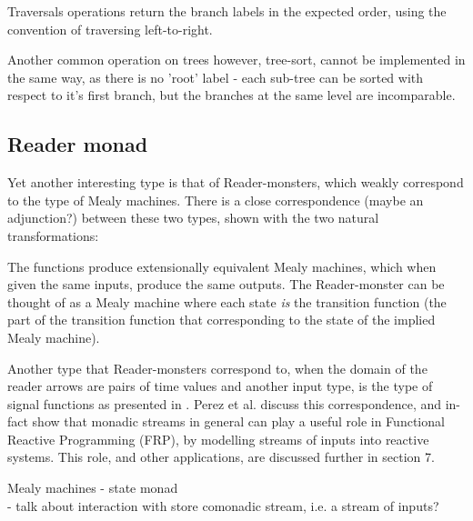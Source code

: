\documentclass{article}
\begin{document}
Traversals operations return the branch labels in the expected order, using the convention of traversing left-to-right.

Another common operation on trees however, tree-sort, cannot be implemented in the same way, as there is no 'root' label - each sub-tree can be sorted with respect to it's first branch, but the branches at the same level are incomparable.

\subsection{Reader monad}

Yet another interesting type is that of Reader-monsters, which weakly correspond to the type of Mealy machines. There is a close correspondence (maybe an adjunction?) between these two types, shown with the two natural transformations:
The functions produce extensionally equivalent Mealy machines, which when given the same inputs, produce the same outputs. The Reader-monster can be thought of as a Mealy machine where each state \emph{is} the transition function (the part of the transition function that corresponding to the state of the implied Mealy machine).

Another type that Reader-monsters correspond to, when the domain of the reader arrows are pairs of time values and another input type, is the type of signal functions as presented in \cite{frp_refactored}. Perez et al. discuss this correspondence, and in-fact show that monadic streams in general can play a useful role in Functional Reactive Programming (FRP), by modelling streams of inputs into reactive systems. This role, and other applications, are discussed further in section 7.
                             
Mealy machines - state monad \\
 - talk about interaction with store comonadic stream, i.e. a stream of inputs? \\
 
\end{document}
